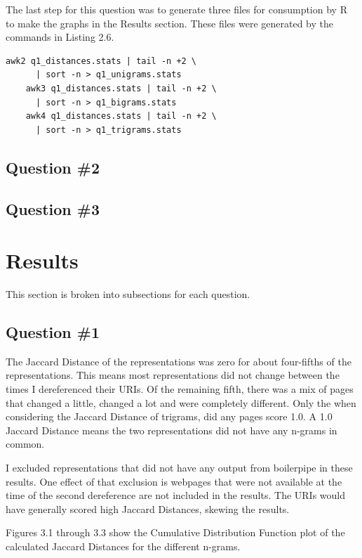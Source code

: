 \documentclass[a4paper,12pt]{article}
\begin{document}
The last step for this question was to generate three files for consumption by R to make the graphs in the
Results section. These files were generated by the commands in Listing 2.6.

\begin{lstlisting}[basicstyle=\ttfamily,caption={Generating R Input Files}]
    awk2 q1_distances.stats | tail -n +2 \
      | sort -n > q1_unigrams.stats
    awk3 q1_distances.stats | tail -n +2 \
      | sort -n > q1_bigrams.stats
    awk4 q1_distances.stats | tail -n +2 \
      | sort -n > q1_trigrams.stats
\end{lstlisting}

\subsection{Question \#2}


\subsection{Question \#3}



\section{Results}
This section is broken into subsections for each question.

\subsection{Question \#1}
The Jaccard Distance of the representations was zero for about four-fifths of the representations. This means
most representations did not change between the times I dereferenced their URIs. Of the remaining fifth,
there was a mix of pages that changed a little, changed a lot and were completely different. Only the
when considering the Jaccard Distance of trigrams, did any pages score 1.0. A 1.0 Jaccard Distance means
the two representations did not have any n-grams in common.

I excluded representations that did not have any output from boilerpipe in these results. One effect of that
exclusion is webpages that were not available at the time of the second dereference are not included in the
results. The URIs would have generally scored high Jaccard Distances, skewing the results.

Figures 3.1 through 3.3 show the Cumulative Distribution Function plot of the calculated Jaccard Distances
for the different n-grams.
\end{document}
